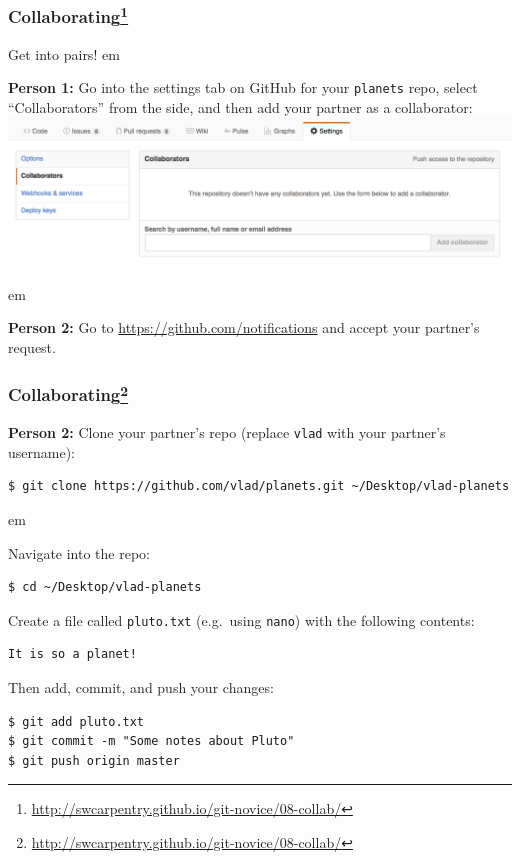 \documentclass{beamer}
\begin{document}
\begin{frame}[fragile]
\frametitle{Collaborating\footnote{\url{http://swcarpentry.github.io/git-novice/08-collab/}}}

Get into pairs!
 em
\pause

\textbf{Person 1:} Go into the settings tab on GitHub for your \texttt{planets} repo, select ``Collaborators'' from the side, and then add your partner as a collaborator:\\
\includegraphics[width=\textwidth]{github-add-collaborators.png}

 em

\textbf{Person 2:} Go to \url{https://github.com/notifications} and accept your partner's request.

\end{frame}

\begin{frame}[fragile]
\frametitle{Collaborating\footnote{\url{http://swcarpentry.github.io/git-novice/08-collab/}}}

\textbf{Person 2:} Clone your partner's repo (replace \texttt{vlad} with your partner's username):
\begin{verbatim}
$ git clone https://github.com/vlad/planets.git ~/Desktop/vlad-planets
\end{verbatim}
 em

Navigate into the repo:
\begin{verbatim}
$ cd ~/Desktop/vlad-planets
\end{verbatim}

Create a file called \texttt{pluto.txt} (e.g.~using \texttt{nano}) with the following contents:
\begin{verbatim}
It is so a planet!
\end{verbatim}

Then add, commit, and push your changes:
\begin{verbatim}
$ git add pluto.txt
$ git commit -m "Some notes about Pluto"
$ git push origin master
\end{verbatim}

\end{frame}
\end{document}
